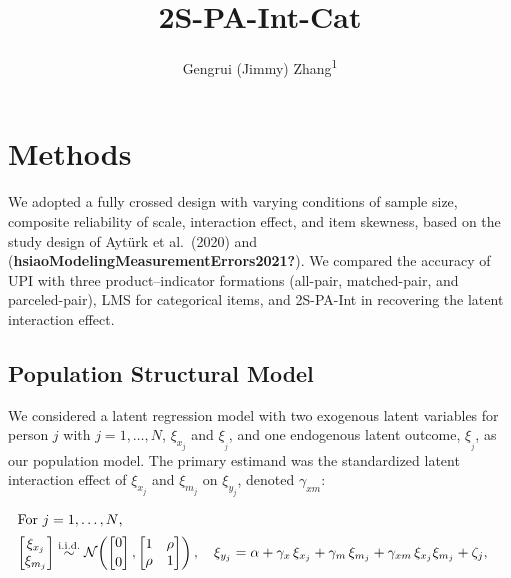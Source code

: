 \documentclass[
  man]{apa6}
\title{2S-PA-Int-Cat}
\author{Gengrui (Jimmy) Zhang\textsuperscript{1}}
\date{}
\affiliation{\vspace{0.5cm}\textsuperscript{1} University of Southhern California}
\begin{document}
\maketitle

\section{Methods}\label{methods}

We adopted a fully crossed design with varying conditions of sample
size, composite reliability of scale, interaction effect, and item
skewness, based on the study design of Aytürk et al.~(2020) and
(\textbf{hsiaoModelingMeasurementErrors2021?}). We compared the accuracy of UPI
with three product--indicator formations (all-pair, matched-pair, and
parceled-pair), LMS for categorical items, and 2S-PA-Int in recovering
the latent interaction effect.

\subsection{Population Structural Model}\label{population-structural-model}

We considered a latent regression model with two exogenous latent
variables for person \(j\) with \(j=1,\ldots,N\), \(\xi_{x_{j}}\) and
\(\xi_{_{j}}\), and one endogenous latent outcome, \(\xi_{_{j}}\), as our
population model. The primary estimand was the standardized latent
interaction effect of \(\xi_{x_{j}}\) and \(\xi_{m_{j}}\) on \(\xi_{y_{j}}\),
denoted \(\gamma_{xm}\):

\begin{align}
\intertext{For $j=1,\ldots,N$,}
\begin{bmatrix}\xi_{x_{j}} \\ \xi_{m_{j}}\end{bmatrix}
&\stackrel{\text{i.i.d.}}{\sim}
\mathcal{N}\!\left(
\begin{bmatrix}0\\[2pt]0\end{bmatrix},
\begin{bmatrix}1 & \rho \\ \rho & 1\end{bmatrix}
\right),\quad
\xi_{y_{j}} = \alpha + \gamma_{x}\,\xi_{x_{j}} + \gamma_{m}\,\xi_{m_{j}}
             + \gamma_{xm}\,\xi_{x_{j}}\xi_{m_{j}} + \zeta_{j},
\end{align}
\end{document}
